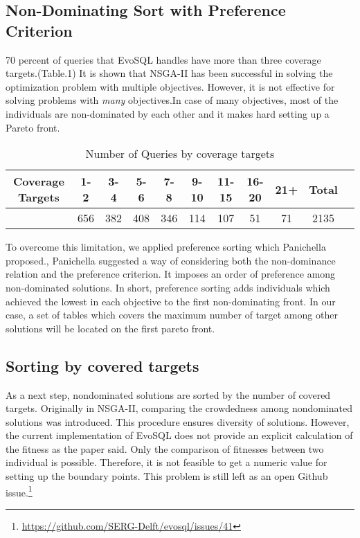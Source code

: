 \subsection{Non-Dominating Sort with Preference Criterion}
70 percent of queries that EvoSQL handles have more than three coverage targets.(Table.1) It is shown that NSGA-II has been successful in solving the optimization problem with multiple objectives. However, it is not effective for solving problems with \textit{many} objectives.In case of many objectives, most of the individuals are non-dominated by each other and it makes hard setting up a Pareto front. 

\begin{table}
	\centering
	\label{tbl:num_of_coverage_targets}
	
	\begin{tabular}{c|c|c|c|c|c|c|c|c|cr}
		Coverage Targets & 1-2 & 3-4 & 5-6 & 7-8 & 9-10 & 11-15 & 16-20 & 21+ & Total \\ 
		\hline
		& 656 & 382 & 408 & 346 & 114  & 107   & 51    & 71  & 2135
	\end{tabular} 
	\caption{Number of Queries by coverage targets}
\end{table}


To overcome this limitation, we applied preference sorting which Panichella \etal proposed., Panichella \etal suggested a way of considering both the non-dominance relation and the preference criterion. It imposes an order of preference among non-dominated solutions. In short, preference sorting adds individuals which achieved the lowest in each objective to the first non-dominating front.  In our case, a set of tables which covers the maximum number of target among other solutions will be located on the first pareto front. 



\subsection{Sorting by covered targets}
As a next step, nondominated solutions are sorted by the number of covered targets. Originally in NSGA-II, comparing the crowdedness among nondominated solutions was introduced. This procedure ensures diversity of solutions. However, the current implementation of EvoSQL does not provide an explicit calculation of the fitness as the paper said. Only the comparison of fitnesses between two individual is possible. Therefore, it is not feasible to get a numeric value for setting up the boundary points. This problem is still left as an open Github issue.\footnote[1]{\href{https://github.com/SERG-Delft/evosql/issues/41}{https://github.com/SERG-Delft/evosql/issues/41}}

